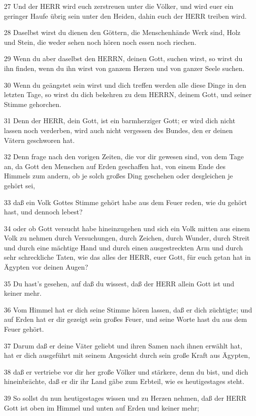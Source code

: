 \par 27 Und der HERR wird euch zerstreuen unter die Völker, und wird euer ein geringer Haufe übrig sein unter den Heiden, dahin euch der HERR treiben wird.
\par 28 Daselbst wirst du dienen den Göttern, die Menschenhände Werk sind, Holz und Stein, die weder sehen noch hören noch essen noch riechen.
\par 29 Wenn du aber daselbst den HERRN, deinen Gott, suchen wirst, so wirst du ihn finden, wenn du ihn wirst von ganzem Herzen und von ganzer Seele suchen.
\par 30 Wenn du geängstet sein wirst und dich treffen werden alle diese Dinge in den letzten Tage, so wirst du dich bekehren zu dem HERRN, deinem Gott, und seiner Stimme gehorchen.
\par 31 Denn der HERR, dein Gott, ist ein barmherziger Gott; er wird dich nicht lassen noch verderben, wird auch nicht vergessen des Bundes, den er deinen Vätern geschworen hat.
\par 32 Denn frage nach den vorigen Zeiten, die vor dir gewesen sind, von dem Tage an, da Gott den Menschen auf Erden geschaffen hat, von einem Ende des Himmels zum andern, ob je solch großes Ding geschehen oder desgleichen je gehört sei,
\par 33 daß ein Volk Gottes Stimme gehört habe aus dem Feuer reden, wie du gehört hast, und dennoch lebest?
\par 34 oder ob Gott versucht habe hineinzugehen und sich ein Volk mitten aus einem Volk zu nehmen durch Versuchungen, durch Zeichen, durch Wunder, durch Streit und durch eine mächtige Hand und durch einen ausgestreckten Arm und durch sehr schreckliche Taten, wie das alles der HERR, euer Gott, für euch getan hat in Ägypten vor deinen Augen?
\par 35 Du hast's gesehen, auf daß du wissest, daß der HERR allein Gott ist und keiner mehr.
\par 36 Vom Himmel hat er dich seine Stimme hören lassen, daß er dich züchtigte; und auf Erden hat er dir gezeigt sein großes Feuer, und seine Worte hast du aus dem Feuer gehört.
\par 37 Darum daß er deine Väter geliebt und ihren Samen nach ihnen erwählt hat, hat er dich ausgeführt mit seinem Angesicht durch sein große Kraft aus Ägypten,
\par 38 daß er vertriebe vor dir her große Völker und stärkere, denn du bist, und dich hineinbrächte, daß er dir ihr Land gäbe zum Erbteil, wie es heutigestages steht.
\par 39 So sollst du nun heutigestages wissen und zu Herzen nehmen, daß der HERR Gott ist oben im Himmel und unten auf Erden und keiner mehr;
